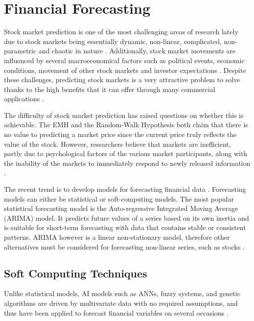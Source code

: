 \documentclass{UoYCSproject}
\begin{document}
\section{Financial Forecasting}
Stock market prediction is one of the most challenging areas of research lately due to stock markets being essentially dynamic, non-linear, complicated, non-parametric and chaotic in nature \cite{tan2005brain}. Additionally, stock market movements are influenced by several macroeconomical factors such as political events, economic conditions, movement of other stock markets and investor expectations \cite{zhang2009stock}. Despite these challenges, predicting stock markets is a very attractive problem to solve thanks to the high benefits that it can offer through many commercial applications \cite{majhi2007stock}. 

The difficulty of stock market prediction has raised questions on whether this is achievable. The EMH and the Random-Walk Hypothesis both claim that there is no value to predicting a market price since the current price truly reflects the value of the stock. However, researchers believe that markets are inefficient, partly due to psychological factors of the various market participants, along with the inability of the markets to immediately respond to newly released information \cite{jensen1978some}. 

The recent trend is to develop models for forecasting financial data \cite{majhi2007stock}. Forecasting models can either be statistical or soft-computing models. The most popular statistical forecasting model is the Auto-regressive Integrated Moving Average (ARIMA) model. It predicts future values of a series based on its own inertia and is suitable for short-term forecasting with data that contains stable or consistent patterns. ARIMA however is a linear non-stationary model, therefore other alternatives must be considered for forecasting non-linear series, such as stocks \cite{wang1996stock}. 

\subsection{Soft Computing Techniques}
Unlike statistical models, AI models such as ANNs, fuzzy systems, and genetic algorithms are driven by multivariate data with no required assumptions, and thus have been applied to forecast financial variables on several occasions \cite{zhong2017forecasting}. 
\end{document}
